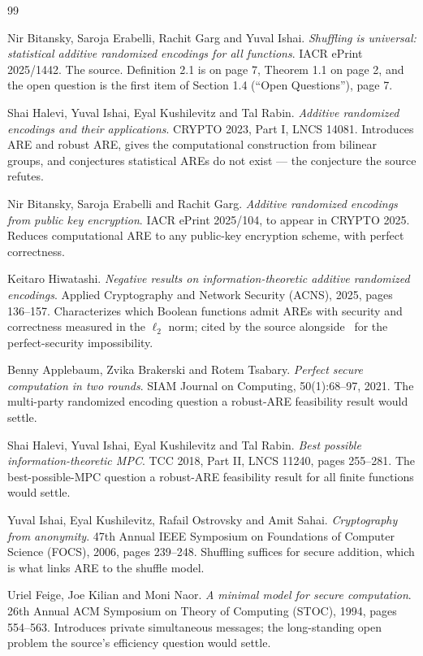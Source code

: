 \documentclass{aicr-conjecture}
\begin{document}
\begin{aicrbibliography}{99}

Nir Bitansky, Saroja Erabelli, Rachit Garg and Yuval Ishai.
\emph{Shuffling is universal: statistical additive randomized encodings
for all functions}.
IACR ePrint 2025/1442.
The source. Definition 2.1 is on page 7, Theorem 1.1 on page 2, and the
open question is the first item of Section 1.4 (``Open Questions''),
page 7.

Shai Halevi, Yuval Ishai, Eyal Kushilevitz and Tal Rabin.
\emph{Additive randomized encodings and their applications}.
CRYPTO 2023, Part I, LNCS 14081.
Introduces ARE and robust ARE, gives the computational construction from
bilinear groups, and conjectures statistical AREs do not exist --- the
conjecture the source refutes.

Nir Bitansky, Saroja Erabelli and Rachit Garg.
\emph{Additive randomized encodings from public key encryption}.
IACR ePrint 2025/104, to appear in CRYPTO 2025.
Reduces computational ARE to any public-key encryption scheme, with
perfect correctness.

Keitaro Hiwatashi.
\emph{Negative results on information-theoretic additive randomized
encodings}.
Applied Cryptography and Network Security (ACNS), 2025, pages 136--157.
Characterizes which Boolean functions admit AREs with security and
correctness measured in the $\ell_{2}$ norm; cited by the source
alongside~\cite{HIKR23} for the perfect-security impossibility.

Benny Applebaum, Zvika Brakerski and Rotem Tsabary.
\emph{Perfect secure computation in two rounds}.
SIAM Journal on Computing, 50(1):68--97, 2021.
The multi-party randomized encoding question a robust-ARE feasibility
result would settle.

Shai Halevi, Yuval Ishai, Eyal Kushilevitz and Tal Rabin.
\emph{Best possible information-theoretic MPC}.
TCC 2018, Part II, LNCS 11240, pages 255--281.
The best-possible-MPC question a robust-ARE feasibility result for all
finite functions would settle.

Yuval Ishai, Eyal Kushilevitz, Rafail Ostrovsky and Amit Sahai.
\emph{Cryptography from anonymity}.
47th Annual IEEE Symposium on Foundations of Computer Science (FOCS),
2006, pages 239--248.
Shuffling suffices for secure addition, which is what links ARE to the
shuffle model.

Uriel Feige, Joe Kilian and Moni Naor.
\emph{A minimal model for secure computation}.
26th Annual ACM Symposium on Theory of Computing (STOC), 1994, pages
554--563.
Introduces private simultaneous messages; the long-standing open problem
the source's efficiency question would settle.

\end{aicrbibliography}
\end{document}
